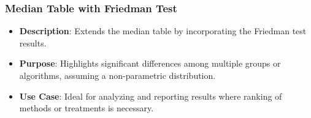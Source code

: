 \documentclass[11pt]{article}
\providecommand{\tightlist}{%
      \setlength{\itemsep}{0pt}\setlength{\parskip}{0pt}}
\begin{document}
\subsubsection{Median Table with Friedman Test}
\begin{itemize}
  \tightlist
  \item
    \textbf{Description}: Extends the median table by incorporating the
    Friedman test results.\\
  \item
    \textbf{Purpose}: Highlights significant differences among multiple
    groups or algorithms, assuming a non-parametric distribution.\\
  \item
    \textbf{Use Case}: Ideal for analyzing and reporting results where
    ranking of methods or treatments is necessary.
  \end{itemize}
\end{document}
